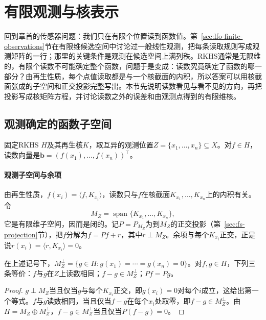 
\section{有限观测与核表示}
\label{sec:rkhs-finite-observations}

回到章首的传感器问题：我们只在有限个位置读到函数值。第~\ref{sec:lfo-finite-observations}节在有限维候选空间中讨论过一般线性观测，把每条读取规则写成观测矩阵的一行；那里的关键条件是观测在候选空间上满列秩。RKHS通常是无限维的，有限个读数不可能确定整个函数，问题于是变成：读数究竟确定了函数的哪一部分？由再生性质，每个点值读取都是与一个核截面的内积，所以答案可以用核截面张成的子空间和正交投影完整写出。本节先说明读数看见与看不见的方向，再把投影写成核矩阵方程，并讨论读数之外的误差和由观测点得到的有限维核。

\subsection{观测确定的函数子空间}
\label{sec:rkhs-observed-subspace}

固定RKHS $H$及其再生核$K$，取互异的观测位置$Z=\{x_1,\ldots,x_n\}\subseteq X$。对$f\in H$，读数向量是$\bm b=(f(x_1),\ldots,f(x_n))^{\top}$。

\paragraph{观测子空间与余项}

由再生性质，$f(x_i)=\langle f,K_{x_i}\rangle$，读数只与$f$在核截面$K_{x_1},\ldots,K_{x_n}$上的内积有关。令
\[
M_Z=\operatorname{span}\{K_{x_1},\ldots,K_{x_n}\},
\]
它是有限维子空间，因而是闭的。记$P=P_{M_Z}$为到$M_Z$的正交投影（第~\ref{sec:fs-projection}节），把$f$分解为$f=Pf+r$，其中$r\perp M_Z$。余项与每个$K_{x_i}$正交，正是说$r(x_i)=\langle r,K_{x_i}\rangle=0$。

\begin{theorem}[观测子空间]
\label{thm:rkhs-observed-subspace}
在上述记号下，$M_Z^\perp=\{g\in H:g(x_1)=\cdots=g(x_n)=0\}$。对$f,g\in H$，下列三条等价：$f$与$g$在$Z$上读数相同；$f-g\in M_Z^\perp$；$Pf=Pg$。
\end{theorem}

\begin{proof}
$g\perp M_Z$当且仅当$g$与每个$K_{x_i}$正交，即$g(x_i)=0$对每个$i$成立，这给出第一个等式。$f$与$g$读数相同，当且仅当$f-g$在每个$x_i$处取零，即$f-g\in M_Z^\perp$。由$H=M_Z\oplus M_Z^\perp$，$f-g\in M_Z^\perp$当且仅当$P(f-g)=0$。
\end{proof}

